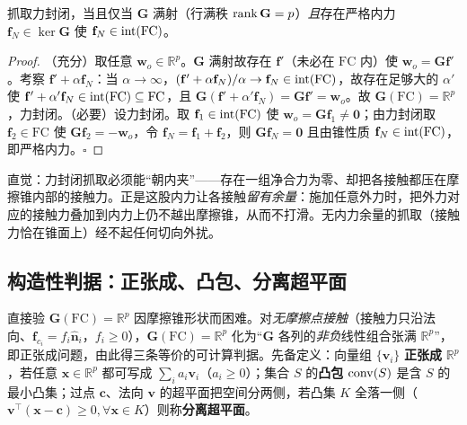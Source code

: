 \begin{proposition}
\label{prop:gc-internal-necessity}
抓取力封闭，当且仅当 $\mathbf{G}$ 满射（行满秩 $\operatorname{rank}\mathbf{G}=p$）\emph{且}存在严格内力 $\mathbf{f}_N\in\ker\mathbf{G}$ 使 $\mathbf{f}_N\in\operatorname{int}(\mathrm{FC})$。
\end{proposition}
\begin{proof}
（充分）取任意 $\mathbf{w}_o\in\mathbb{R}^p$。$\mathbf{G}$ 满射故存在 $\mathbf{f}'$（未必在 $\mathrm{FC}$ 内）使 $\mathbf{w}_o=\mathbf{G}\mathbf{f}'$。考察 $\mathbf{f}'+\alpha\mathbf{f}_N$：当 $\alpha\to\infty$，$(\mathbf{f}'+\alpha\mathbf{f}_N)/\alpha\to\mathbf{f}_N\in\operatorname{int}(\mathrm{FC})$，故存在足够大的 $\alpha'$ 使 $\mathbf{f}'+\alpha'\mathbf{f}_N\in\operatorname{int}(\mathrm{FC})\subseteq\mathrm{FC}$，且 $\mathbf{G}(\mathbf{f}'+\alpha'\mathbf{f}_N)=\mathbf{G}\mathbf{f}'=\mathbf{w}_o$。故 $\mathbf{G}(\mathrm{FC})=\mathbb{R}^p$，力封闭。（必要）设力封闭。取 $\mathbf{f}_1\in\operatorname{int}(\mathrm{FC})$ 使 $\mathbf{w}_o=\mathbf{G}\mathbf{f}_1\ne\mathbf{0}$；由力封闭取 $\mathbf{f}_2\in\mathrm{FC}$ 使 $\mathbf{G}\mathbf{f}_2=-\mathbf{w}_o$，令 $\mathbf{f}_N=\mathbf{f}_1+\mathbf{f}_2$，则 $\mathbf{G}\mathbf{f}_N=\mathbf{0}$ 且由锥性质 $\mathbf{f}_N\in\operatorname{int}(\mathrm{FC})$，即严格内力。$\square$
\end{proof}

\noindent 直觉：力封闭抓取必须能“朝内夹”——存在一组净合力为零、却把各接触都压在摩擦锥内部的接触力。正是这股内力让各接触\emph{留有余量}：施加任意外力时，把外力对应的接触力叠加到内力上仍不越出摩擦锥，从而不打滑。无内力余量的抓取（接触力恰在锥面上）经不起任何切向外扰。

\subsection{构造性判据：正张成、凸包、分离超平面}
\label{sec:gc-fc-constructive}

直接验 $\mathbf{G}(\mathrm{FC})=\mathbb{R}^p$ 因摩擦锥形状而困难。对\emph{无摩擦点接触}（接触力只沿法向、$\mathbf{f}_{c_i}=f_i\hat{\mathbf{n}}_i$，$f_i\ge0$），$\mathbf{G}(\mathrm{FC})=\mathbb{R}^p$ 化为“$\mathbf{G}$ 各列的\emph{非负}线性组合张满 $\mathbb{R}^p$”，即正张成问题，由此得三条等价的可计算判据。先备定义\cite{murray1994mathematical}：向量组 $\{\mathbf{v}_i\}$ \textbf{正张成} $\mathbb{R}^p$，若任意 $\mathbf{x}\in\mathbb{R}^p$ 都可写成 $\sum_i a_i\mathbf{v}_i$（$a_i\ge0$）；集合 $S$ 的\textbf{凸包} $\operatorname{conv}(S)$ 是含 $S$ 的最小凸集；过点 $\mathbf{c}$、法向 $\mathbf{v}$ 的超平面把空间分两侧，若凸集 $K$ 全落一侧（$\mathbf{v}^\top(\mathbf{x}-\mathbf{c})\ge0,\forall\mathbf{x}\in K$）则称\textbf{分离超平面}。

